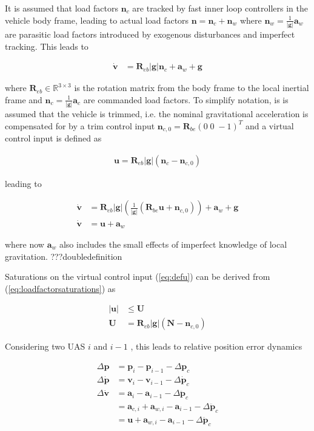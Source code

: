 \documentclass{ifacconf}
\providecommand{\mbf}[1]{\mathbf{#1}}
\newcommand{\idxFollower}{{\ensuremath{i} }}
\newcommand{\idxPredecessor}{{\ensuremath{i-1} }}
\begin{document}
It is assumed that load factors $\mbf{n}_c$ are tracked by fast inner loop controllers in the vehicle body frame, leading to actual load factors $\mbf{n} = \mbf{n}_c + \mbf{n}_w$ where $\mbf{n}_w = \frac{1}{|\mbf{g}|} \mbf{a}_w$ are parasitic load factors introduced by exogenous disturbances and imperfect tracking. This leads to

\begin{align}
\dot{\mbf{v}} &= \mbf{R}_{eb} |\mbf{g}|\mbf{n}_c + \mbf{a}_w + \mbf{g}
\label{eq:svmloadfactorlevel}
\end{align}

where $\mbf{R}_{eb} \in \mathbb{R}^{3 \times 3}$ is the rotation matrix from the body frame to the local inertial frame and $\mbf{n}_c = \frac{1}{|\mbf{g}|} \mbf{a}_c$ are commanded load factors. To simplify notation, is is assumed that the vehicle is trimmed, i.e. the nominal gravitational acceleration is compensated for by a trim control input $\mbf{n}_{c,0} = \mbf{R}_{be}(0 \; 0 \; -1)^{T}$ and a virtual control input is defined as

\begin{align}
\mbf{u} = \mbf{R}_{eb} |\mbf{g}|(\mbf{n}_c - \mbf{n}_{c,0})	
\label{eq:defushort}
\end{align}

leading to

\begin{align}
\dot{\mbf{v}} &= \mbf{R}_{eb}|\mbf{g}|
(
\frac{1}{|\mbf{g}|}
(\mbf{R}_{be} \mbf{u} + \mbf{n}_{c,0})
) + \mbf{a}_w + \mbf{g}\\
\dot{\mbf{v}} &= \mbf{u} + \mbf{a}_w
\label{eq:svmshort}
\end{align}

where now $\mbf{a}_w$ also includes the small effects of imperfect knowledge of local gravitation. ???doubledefinition

Saturations on the virtual control input (\ref{eq:defu}) can be derived from (\ref{eq:loadfactorsaturations}) as

\begin{align}
|\mbf{u}| &\leq \mbf{U} \\
\mbf{U} &= \mbf{R}_{eb} |\mbf{g}|(\mbf{N}-\mbf{n}_{c,0})
\end{align}


Considering two UAS \idxFollower  and \idxPredecessor, this leads to relative position error dynamics

\begin{align}
\Delta \mbf{p} &= \mbf{p}_\idxFollower - \mbf{p}_\idxPredecessor - \Delta \mbf{p}_c \\
\Delta \dot{\mbf{p}} &= \mbf{v}_{\idxFollower} - \mbf{v}_{\idxPredecessor} -  \Delta \dot{\mbf{p}}_c\\
\Delta \dot{\mbf{v}} &= \mbf{a}_\idxFollower - \mbf{a}_\idxPredecessor -  \Delta \ddot{\mbf{p}}_c\\
{} &= \mbf{a}_{c,\idxFollower} + \mbf{a}_{w,\idxFollower}
 - \mbf{a}_\idxPredecessor -  \Delta \ddot{\mbf{p}}_c\\
{} &= \mbf{u} + \mbf{a}_{w,\idxFollower}
 - \mbf{a}_\idxPredecessor -  \Delta \ddot{\mbf{p}}_c
\end{align}
\end{document}
